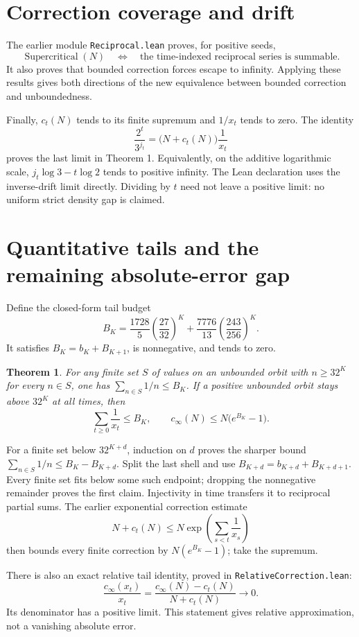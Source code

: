 \documentclass[10pt]{article}
\newtheorem{theorem}{Theorem}
\begin{document}
\section{Correction coverage and drift}
The earlier module \texttt{Reciprocal.lean} proves, for positive seeds,
\[
\operatorname{Supercritical}(N)
\quad\Longleftrightarrow\quad
\text{the time-indexed reciprocal series is summable}.
\]
It also proves that bounded correction forces escape to infinity. Applying
these results gives both directions of the new equivalence between bounded
correction and unboundedness.

Finally, $c_t(N)$ tends to its finite supremum and $1/x_t$ tends to zero.
The identity
\[
\frac{2^t}{3^{j_t}}=\bigl(N+c_t(N)\bigr)\frac1{x_t}
\]
proves the last limit in Theorem 1. Equivalently, on the additive logarithmic
scale, $j_t\log3-t\log2$ tends to positive infinity. The Lean declaration
uses the inverse-drift limit directly. Dividing by $t$ need not leave a
positive limit: no uniform strict density gap is claimed.

\section{Quantitative tails and the remaining absolute-error gap}
Define the closed-form tail budget
\[
B_K=\frac{1728}{5}\left(\frac{27}{32}\right)^K
 +\frac{7776}{13}\left(\frac{243}{256}\right)^K.
\]
It satisfies $B_K=b_K+B_{K+1}$, is nonnegative, and tends to zero.
\begin{theorem}
For any finite set $S$ of values on an unbounded orbit with $n\ge32^K$
for every $n\in S$, one has $\sum_{n\in S}1/n\le B_K$.
If a positive unbounded orbit stays above $32^K$ at all times, then
\[
\sum_{t\ge0}\frac1{x_t}\le B_K,
\qquad c_\infty(N)\le N\bigl(e^{B_K}-1\bigr).
\]
\end{theorem}
For a finite set below $32^{K+d}$, induction on $d$ proves the sharper bound
$\sum_{n\in S}1/n\le B_K-B_{K+d}$. Split the last shell and use
$B_{K+d}=b_{K+d}+B_{K+d+1}$. Every finite set fits below some such endpoint;
dropping the nonnegative remainder proves the first claim. Injectivity in
time transfers it to reciprocal partial sums. The earlier exponential
correction estimate
\[
N+c_t(N)\le N\exp\!\left(\sum_{s<t}\frac1{x_s}\right)
\]
then bounds every finite correction by $N(e^{B_K}-1)$; take the supremum.

There is also an exact relative tail identity, proved in
\texttt{RelativeCorrection.lean}:
\[
\frac{c_\infty(x_t)}{x_t}
 =\frac{c_\infty(N)-c_t(N)}{N+c_t(N)}\longrightarrow0.
\]
Its denominator has a positive limit. This statement gives relative
approximation, not a vanishing absolute error.
\end{document}
